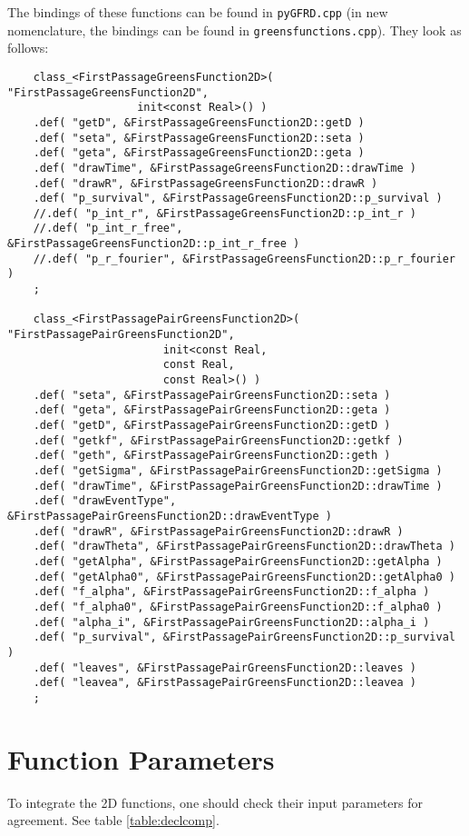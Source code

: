 \documentclass[a4paper,10pt]{article}
\begin{document}
The bindings of these functions can be found in \texttt{pyGFRD.cpp} (in new nomenclature, the bindings can be found in \texttt{greensfunctions.cpp}). They look as follows:

\label{boostdeclaration}
\begin{verbatim}
    class_<FirstPassageGreensFunction2D>( "FirstPassageGreensFunction2D",
					init<const Real>() )
	.def( "getD", &FirstPassageGreensFunction2D::getD )
	.def( "seta", &FirstPassageGreensFunction2D::seta )
	.def( "geta", &FirstPassageGreensFunction2D::geta )
	.def( "drawTime", &FirstPassageGreensFunction2D::drawTime )
	.def( "drawR", &FirstPassageGreensFunction2D::drawR )
	.def( "p_survival", &FirstPassageGreensFunction2D::p_survival )
	//.def( "p_int_r", &FirstPassageGreensFunction2D::p_int_r )
	//.def( "p_int_r_free", &FirstPassageGreensFunction2D::p_int_r_free )
	//.def( "p_r_fourier", &FirstPassageGreensFunction2D::p_r_fourier )
	;

    class_<FirstPassagePairGreensFunction2D>( "FirstPassagePairGreensFunction2D",
					    init<const Real, 
					    const Real,
					    const Real>() )
	.def( "seta", &FirstPassagePairGreensFunction2D::seta )
	.def( "geta", &FirstPassagePairGreensFunction2D::geta )
	.def( "getD", &FirstPassagePairGreensFunction2D::getD )
	.def( "getkf", &FirstPassagePairGreensFunction2D::getkf )
	.def( "geth", &FirstPassagePairGreensFunction2D::geth )
	.def( "getSigma", &FirstPassagePairGreensFunction2D::getSigma )
	.def( "drawTime", &FirstPassagePairGreensFunction2D::drawTime )
	.def( "drawEventType", &FirstPassagePairGreensFunction2D::drawEventType )
	.def( "drawR", &FirstPassagePairGreensFunction2D::drawR )
	.def( "drawTheta", &FirstPassagePairGreensFunction2D::drawTheta )
	.def( "getAlpha", &FirstPassagePairGreensFunction2D::getAlpha )
	.def( "getAlpha0", &FirstPassagePairGreensFunction2D::getAlpha0 )
	.def( "f_alpha", &FirstPassagePairGreensFunction2D::f_alpha )
	.def( "f_alpha0", &FirstPassagePairGreensFunction2D::f_alpha0 )
	.def( "alpha_i", &FirstPassagePairGreensFunction2D::alpha_i )
	.def( "p_survival", &FirstPassagePairGreensFunction2D::p_survival )
	.def( "leaves", &FirstPassagePairGreensFunction2D::leaves )
	.def( "leavea", &FirstPassagePairGreensFunction2D::leavea )
	;
\end{verbatim} 

\section{Function Parameters}

To integrate the 2D functions, one should check their input parameters for agreement. See table \ref{table:declcomp}.
\end{document}
